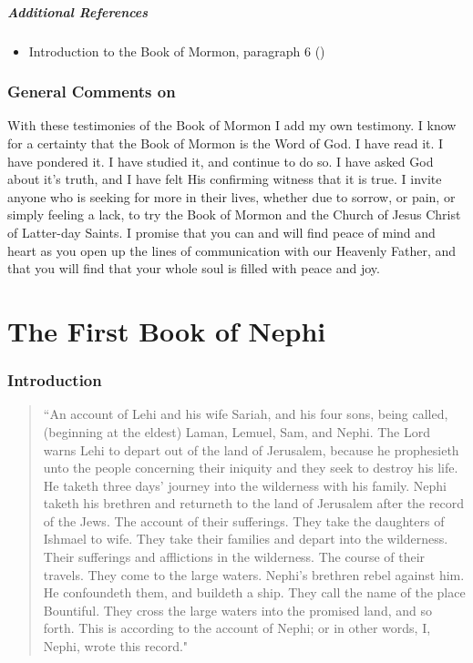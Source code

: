 \documentclass[12pt]{report}
\begin{document}
\subsubsection{Additional References\label{js:referencesFinal}}
\begin{itemize}
\item Introduction to the Book of Mormon, paragraph 6 ()
\end{itemize}

\section{General Comments on }
With these testimonies of the Book of Mormon I add my own testimony.  I know for a certainty that the Book of Mormon is the Word of God.  I have read it.  I have pondered it.  I have studied it, and continue to do so.  I have asked God about it's truth, and I have felt His confirming witness that it is true.  I invite anyone who is seeking for more in their lives, whether due to sorrow, or pain, or simply feeling a lack, to try the Book of Mormon and the Church of Jesus Christ of Latter-day Saints.  I promise that you can and will find peace of mind and heart as you open up the lines of communication with our Heavenly Father, and that you will find that your whole soul is filled with peace and joy.

\part{The First Book of Nephi\label{BoM:1Nephi}}
\section{Introduction\label{1Nephi:intro}}
\begin{center}
\begin{quote}
``An account of Lehi and his wife Sariah, and his four sons, being called, (beginning at the eldest) Laman, Lemuel, Sam, and Nephi.  The Lord warns Lehi to depart out of the land of Jerusalem, because he prophesieth unto the people concerning their iniquity and they seek to destroy his life.  He taketh three days' journey into the wilderness with his family.  Nephi taketh his brethren and returneth to the land of Jerusalem after the record of the Jews.  The account of their sufferings.  They take the daughters of Ishmael to wife.  They take their families and depart into the wilderness.  Their sufferings and afflictions in the wilderness.  The course of their travels.  They come to the large waters.  Nephi's brethren rebel against him.  He confoundeth them, and buildeth a ship.  They call the name of the place Bountiful.  They cross the large waters into the promised land, and so forth.  This is according to the account of Nephi; or in other words, I, Nephi, wrote this record."
\end{quote}
\end{center}
\end{document}
